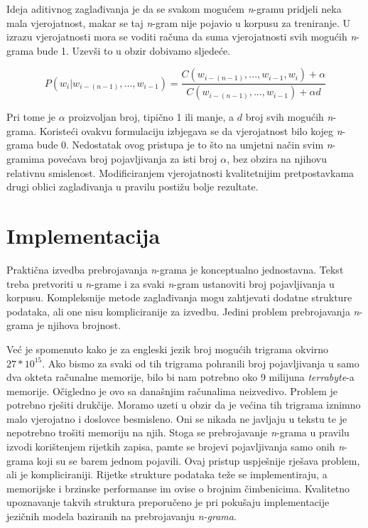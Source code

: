 \documentclass[times, utf8, diplomski, numeric]{fer}
\begin{document}
Ideja aditivnog zaglađivanja je da se svakom mogućem \textit{n}-gramu pridjeli neka mala vjerojatnost, makar se taj \textit{n}-gram nije pojavio u korpusu za treniranje. U izrazu vjerojatnosti mora se voditi računa da suma vjerojatnosti svih mogućih \textit{n}-grama bude 1. Uzevši to u obzir dobivamo sljedeće.

\[
P(w_i | w_{i - (n - 1)}, ... , w_{i - 1}) = \frac{C(w_{i - (n - 1)}, ... , w_{i - 1}, w_i) + \alpha}{C(w_{i - (n - 1)}, ... , w_{i - 1}) + \alpha d}
\]

Pri tome je $\alpha$ proizvoljan broj, tipično 1 ili manje, a $d$ broj svih mogućih \textit{n}-grama. Koristeći ovakvu formulaciju izbjegava se da vjerojatnost bilo kojeg \textit{n}-grama bude 0. Nedostatak ovog pristupa je to što na umjetni način svim \textit{n}-gramima povećava broj pojavljivanja za isti broj $\alpha$, bez obzira na njihovu relativnu smislenost. Modificiranjem vjerojatnosti kvalitetnijim pretpostavkama drugi oblici zaglađivanja u pravilu postižu bolje rezultate.

\section{Implementacija}

Praktična izvedba prebrojavanja \textit{n}-grama je konceptualno jednostavna. Tekst treba pretvoriti u \textit{n}-grame i za svaki \textit{n}-gram ustanoviti broj pojavljivanja u korpusu. Kompleksnije metode zaglađivanja mogu zahtjevati dodatne strukture podataka, ali one nisu kompliciranije za izvedbu. Jedini problem prebrojavanja \textit{n}-grama je njihova brojnost.

Već je spomenuto kako je za engleski jezik broj mogućih trigrama okvirno $27 * 10^{15}$. Ako bismo za svaki od tih trigrama pohranili broj pojavljivanja u samo dva okteta računalne memorije, bilo bi nam potrebno oko 9 milijuna \textit{terrabyte}-a memorije. Očigledno je ovo sa današnjim računalima neizvedivo. Problem je potrebno rješiti drukčije. Moramo uzeti u obzir da je većina tih trigrama iznimno malo vjerojatno i doslovce besmisleno. Oni se nikada ne javljaju u tekstu te je nepotrebno trošiti memoriju na njih. Stoga se prebrojavanje \textit{n}-grama u pravilu izvodi korištenjem rijetkih  zapisa, pamte se brojevi pojavljivanja samo onih \textit{n}-grama koji su se barem jednom pojavili. Ovaj pristup uspješnije rješava problem, ali je kompliciraniji. Rijetke strukture podataka teže se implementiraju, a memorijske i brzinske performanse im ovise o brojnim čimbenicima. Kvalitetno upoznavanje takvih struktura preporučeno je pri pokušaju implementacije jezičnih modela baziranih na prebrojavanju \textit{n-grama}.
\end{document}
